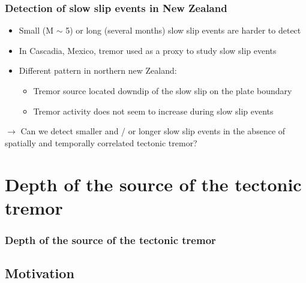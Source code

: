 \documentclass{beamer}
\begin{document}
	\begin{frame}
		\frametitle{Detection of slow slip events in New Zealand}
		\begin{itemize}
			\item Small (M $\sim$ 5) or long (several months) slow slip events are harder to detect
			\item In Cascadia, Mexico, tremor used as a proxy to study slow slip events
			\item Different pattern in northern new Zealand:
			\begin{itemize}
				\item Tremor source located downdip of the slow slip on the plate boundary
				\item Tremor activity does not seem to increase during slow slip events
			\end{itemize}
		\end{itemize}

		\begin{block}{}
			$\rightarrow$ Can we detect smaller and / or longer slow slip events in the absence of spatially and temporally correlated tectonic tremor?
		\end{block}			
	\end{frame}

				
	\section{Depth of the source of the tectonic tremor}

	\begin{frame}
		\frametitle{Depth of the source of the tectonic tremor}
	\end{frame}

	\subsection{Motivation}
\end{document}
